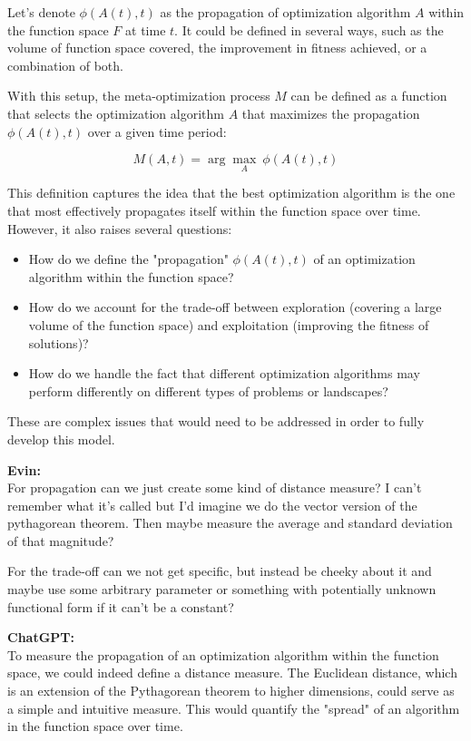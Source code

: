 \documentclass{article}[10pt]
\begin{document}
Let's denote \( \phi(A(t), t) \) as the propagation of optimization algorithm \( A \) within the function space \( F \) at time \( t \). 
It could be defined in several ways, such as the volume of function space covered, the improvement in fitness achieved, or a combination of both.\par

With this setup, the meta-optimization process \( M \) can be defined as a function that selects the optimization algorithm \( A \) that maximizes the propagation \( \phi(A(t), t) \) over a given time period:

\[
M(A, t) = \arg\max_{A} \ \phi(A(t), t)
\]

This definition captures the idea that the best optimization algorithm is the one that most effectively propagates itself within the function space over time. 
However, it also raises several questions:\par
\begin{itemize}
    \item How do we define the "propagation" \( \phi(A(t), t) \) of an optimization algorithm within the function space? 
    \item How do we account for the trade-off between exploration (covering a large volume of the function space) and exploitation (improving the fitness of solutions)?
    \item How do we handle the fact that different optimization algorithms may perform differently on different types of problems or landscapes?
\end{itemize}

These are complex issues that would need to be addressed in order to fully develop this model.\par


\noindent \textbf{Evin:}\\
For propagation can we just create some kind of distance measure? 
I can't remember what it's called but I'd imagine we do the vector version of the pythagorean theorem. 
Then maybe measure the average and standard deviation of that magnitude?\par

For the trade-off can we not get specific, but instead be cheeky about it and maybe use some arbitrary parameter or something with potentially unknown functional form if it can't be a constant?\par

\noindent \textbf{ChatGPT:}\\
To measure the propagation of an optimization algorithm within the function space, we could indeed define a distance measure. 
The Euclidean distance, which is an extension of the Pythagorean theorem to higher dimensions, could serve as a simple and intuitive measure. 
This would quantify the "spread" of an algorithm in the function space over time.\par
\end{document}
